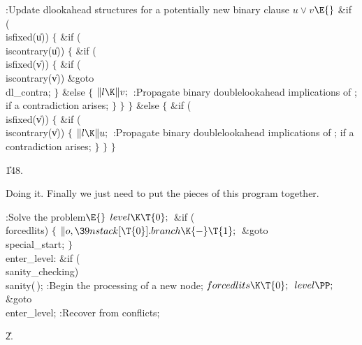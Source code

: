 \B{}:Update dlookahead structures for a potentially new binary clause
$u\lor v$\X${}\E{}$\6
\&{if} (\\{isfixed}(\|u))\5
${}\{{}$\1\6
\&{if} (\\{iscontrary}(\|u))\5
${}\{{}$\1\6
\&{if} (\\{isfixed}(\|v))\5
${}\{{}$\1\6
\&{if} (\\{iscontrary}(\|v))\1\5
\&{goto} \\{dl\_contra};\2\6
\4${}\}{}$\5
\2\&{else}\5
${}\{{}$\1\6
${}\|l\K\|v;{}$\6
:Propagate binary doublelookahead implications of ;  if a contradiction arises\X;\6
\4${}\}{}$\2\6
\4${}\}{}$\2\6
\4${}\}{}$\5
\2\&{else}\5
${}\{{}$\1\6
\&{if} (\\{isfixed}(\|v))\5
${}\{{}$\1\6
\&{if} (\\{iscontrary}(\|v))\5
${}\{{}$\1\6
${}\|l\K\|u;{}$\6
:Propagate binary doublelookahead implications of ;  if a contradiction arises\X;\6
\4${}\}{}$\2\6
\4${}\}{}$\2\6
\4${}\}{}$\2\par
\U148.\fi

Doing it. Finally we just need to put the pieces of this program
together.

\Y\B\4:Solve the problem\X${}\E{}$\6
$\\{level}\K\T{0};{}$\6
\&{if} (\\{forcedlits})\5
${}\{{}$\1\6
${}\|o,\39\\{nstack}[\T{0}].\\{branch}\K{-}\T{1};{}$\6
\&{goto} \\{special\_start};\6
\4${}\}{}$\2\6
\4\\{enter\_level}:\6
\&{if} (\\{sanity\_checking})\1\5
\\{sanity}(\,);\2\6
:Begin the processing of a new node\X;\6
${}\\{forcedlits}\K\T{0};{}$\6
${}\\{level}\PP;{}$\6
\&{goto} \\{enter\_level};\6
:Recover from conflicts\X;\par
\U2.\fi

